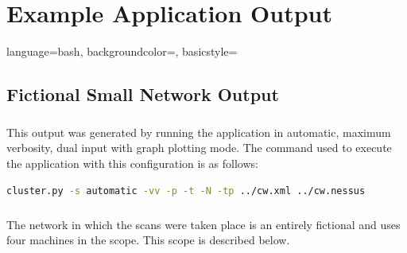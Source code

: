 \chapter{Example Application Output}

{
    language=bash,
    backgroundcolor=\color{white},
    basicstyle=\scriptsize\color{black}\ttfamily
}


\section{Fictional Small Network Output}
\label{fictional}
\paragraph{}This output was generated by running the application in automatic, maximum verbosity, dual input with graph plotting mode. The command used to execute the application with this configuration is as follows: 
\begin{lstlisting}[language=bash]
cluster.py -s automatic -vv -p -t -N -tp ../cw.xml ../cw.nessus
\end{lstlisting}
\paragraph{}The network in which the scans were taken place is an entirely fictional and uses four machines in the scope. This scope is described below.

